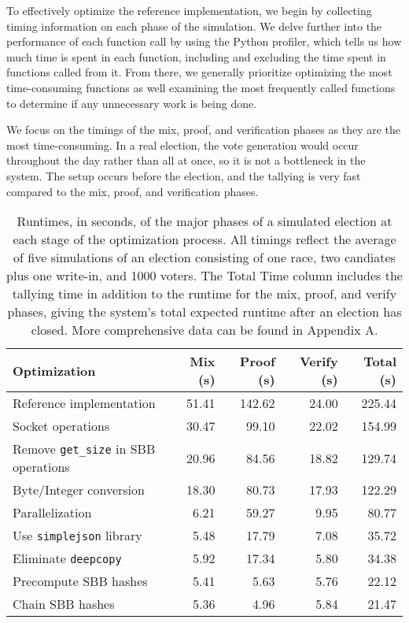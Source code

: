 To effectively optimize the reference implementation, we begin by collecting timing information on each phase of the simulation. We delve further into the performance of each function call by using the Python profiler, which tells us how much time is spent in each function, including and excluding the time spent in functions called from it. From there, we generally prioritize optimizing the most time-consuming functions as well examining the most frequently called functions to determine if any unnecessary work is being done.

We focus on the timings of the mix, proof, and verification phases as they are the most time-consuming. In a real election, the vote generation would occur throughout the day rather than all at once, so it is not a bottleneck in the system. The setup occurs before the election, and the tallying is very fast compared to the mix, proof, and verification phases.

\begin{table}[htbp]
\centering
\begin{tabular}{l | r | r | r || r}
  \textbf{Optimization} & \textbf{Mix (s)} & \textbf{Proof (s)} & \textbf{Verify (s)} & \textbf{Total (s)} \\
  \hline
  Reference implementation & 51.41 & 142.62 & 24.00 & 225.44 \\
  Socket operations & 30.47 & 99.10 & 22.02 & 154.99 \\
  Remove \texttt{get\_size} in SBB operations & 20.96 & 84.56 & 18.82 & 129.74 \\
  Byte/Integer conversion & 18.30 & 80.73 & 17.93 & 122.29 \\
  Parallelization & 6.21 & 59.27 & 9.95 & 80.77 \\
  Use \texttt{simplejson} library & 5.48 & 17.79 & 7.08 & 35.72 \\
  Eliminate \texttt{deepcopy} & 5.92 & 17.34 & 5.80 & 34.38 \\
  Precompute SBB hashes & 5.41 & 5.63 & 5.76 & 22.12 \\
  Chain SBB hashes & 5.36 & 4.96 & 5.84 & 21.47
\end{tabular}
\caption[Election runtime at each stage of optimization]{Runtimes, in seconds, of the major phases of a simulated election at each stage of the optimization process. All timings reflect the average of five simulations of an election consisting of one race, two candiates plus one write-in, and 1000 voters. The Total Time column includes the tallying time in addition to the runtime for the mix, proof, and verify phases, giving the system's total expected runtime after an election has closed. More comprehensive data can be found in Appendix A.}
\label{table:perf:optimizations}
\end{table}

